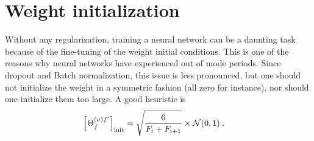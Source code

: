 \section{Weight initialization}

Without any regularization, training a neural network can be a daunting task because of the fine-tuning of the weight initial conditions. This is one of the reasons why neural networks have experienced out of mode periods. Since dropout and Batch normalization, this issue is less pronounced, but one should not initialize the weight in a symmetric fashion (all zero for instance), nor should one initialize them too large. A good heuristic is
\begin{align}
\left[\Theta^{(\nu)f'}_f\right]_{{\rm init}}&=\sqrt{\frac{6}{F_i+F_{i+1}}}\times\mathcal{N}(0,1)\;.
\end{align}

